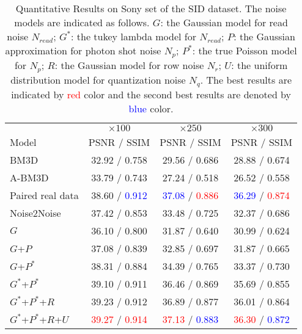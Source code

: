 \documentclass[10pt,twocolumn,letterpaper]{article}
\begin{document}
\begin{table}[!t]
\centering
\caption{Quantitative Results on Sony set of the SID dataset. The noise models are indicated as follows. $G$: the Gaussian model for read noise $N_{read}$; $G^*$: the tukey lambda model for $N_{read}$; $P$: the Gaussian approximation for photon shot noise $N_p$; $P^*$: the true Poisson model for $N_p$;  $R$: the Gaussian model for row noise $N_r$; $U$: the uniform distribution model for quantization noise $N_q$.
The best results are indicated by \textcolor{red}{red} color and the second best results are denoted by \textcolor{blue}{blue} color. }
\footnotesize
\begin{tabular}{lccc} 
		\toprule
		 & $\times 100$ & $\times 250$ & $\times 300$ \\
		Model & PSNR / SSIM & PSNR / SSIM & PSNR / SSIM \\ 
		\midrule
		BM3D  & 32.92 / 0.758 & 29.56 / 0.686 & 28.88 / 0.674 \\ \hline
		A-BM3D & 33.79 /  0.743 & 27.24 / 0.518 & 26.52 / 0.558 \\ \hline
		\midrule
		Paired real data  & 38.60 / \textcolor{blue}{0.912} & \textcolor{blue}{37.08} / \textcolor{red}{0.886} & \textcolor{blue}{36.29} / \textcolor{red}{0.874} \\ \hline
		Noise2Noise  & 37.42 / 0.853 & 33.48 / 0.725 & 32.37 / 0.686 \\ \hline
		\midrule
		$G$  & 36.10 / 0.800 & 31.87 / 0.640 & 30.99 / 0.624 \\ \hline
		$G$+$P$  & 37.08 / 0.839 & 32.85 / 0.697 & 31.87 / 0.665 \\ \hline
		$G$+$P^*$  & 38.31 / 0.884 & 34.39 / 0.765 & 33.37 / 0.730 \\ \hline
		$G^*$+$P^*$  & 39.10 / 0.911 & 36.46 / 0.869 & 35.69 / 0.855 \\ \hline
		$G^*$+$P^*$+$R$  & 39.23 / 0.912 & 36.89 / 0.877 & 36.01 / 0.864 \\ \hline 
		$G^*$+$P^*$+$R$+$U$  & \textcolor{red}{39.27} / \textcolor{red}{0.914} & \textcolor{red}{37.13} / \textcolor{blue}{0.883} & \textcolor{red}{36.30} / \textcolor{blue}{0.872} \\ \hline			
		
		\bottomrule
\end{tabular}
\label{tb:componet}
\end{table}
\end{document}
